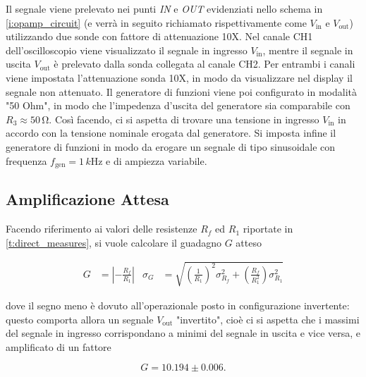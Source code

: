 \documentclass[a4paper,11pt]{article} %
\begin{document}
\noindent Il segnale viene prelevato nei punti \textit{IN} e \textit{OUT} evidenziati nello schema in 
\autoref{i:opamp_circuit} (e verrà in seguito richiamato rispettivamente come $V_{\text{in}}$ e $V_{\text{out}}$)
utilizzando due sonde con fattore di attenuazione 10X. Nel canale CH1 dell'oscilloscopio viene visualizzato il segnale
in ingresso $V_{\text{in}}$, mentre il segnale in uscita $V_{\text{out}}$ è prelevato dalla sonda collegata al canale
CH2. Per entrambi i canali viene impostata l'attenuazione sonda 10X, in modo da visualizzare nel display il segnale non
attenuato. Il generatore di funzioni viene poi configurato in modalità "50 Ohm", in modo che l'impedenza d'uscita del
generatore sia comparabile con $R_3\approx 50\,\si{\ohm}$. Così facendo, ci si aspetta di trovare una tensione in ingresso
$V_{\text{in}}$ in accordo con la tensione nominale erogata dal generatore. Si imposta infine il generatore di funzioni
in modo da erogare un segnale di tipo sinusoidale con frequenza $f_{\text{gen}}=1\,\si{k\hertz}$ e di ampiezza
variabile.


\subsection{Amplificazione Attesa}\label{s:guadagno}
Facendo riferimento ai valori delle resistenze  $R_f$ ed $R_1$ riportate in  \autoref{t:direct_measures}, si vuole
calcolare il guadagno $G$ atteso

\begin{align}\label{e:guadagno}
	G&=\left|-\frac{R_{f}}{R_{1}}\right| 
	&
	\sigma_{G}&=\sqrt{	\left(	\frac{	1	}{	R_{1}	}	\right)^2	\sigma_{R_{f}}^2	
	+	\left(	\frac{	R_{f}	}{	R_{1}^2	}	\right)\sigma_{R_{1}}^2	}	
\end{align}

\noindent dove il segno meno è dovuto all'operazionale posto in configurazione invertente: questo comporta allora un
segnale  $V_{\text{out}}$ "invertito", cioè ci si aspetta che i massimi del segnale in ingresso corrispondano a minimi
del segnale in uscita e vice versa, e amplificato di un fattore 

\begin{equation}
	G = 10.194 \pm 0.006.
\end{equation}
\end{document}
